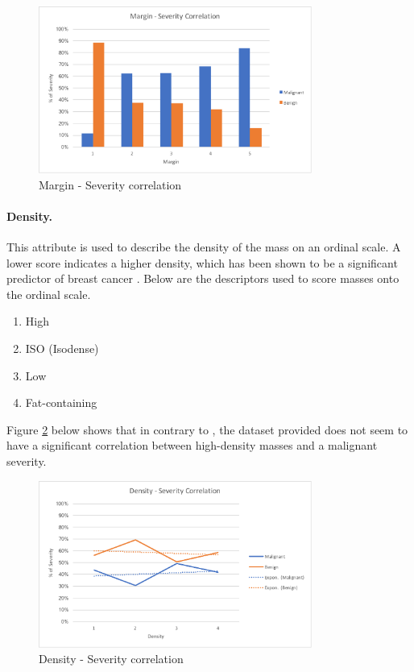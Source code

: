 \documentclass[12pt]{article}
\begin{document}
      \begin{figure}[H]
        \centering
        \includegraphics[width=0.8\textwidth]{margin-severity-correlation}
        \caption{Margin - Severity correlation}
        \label{fig:margin-severity-correlation}
      \end{figure}

    \paragraph{Density.}
      This attribute is used to describe the density of the mass on an ordinal scale. A lower score indicates a higher density, which has been shown to be a significant predictor of breast cancer \citep{woods2011mammographic}. Below are the descriptors used to score masses onto the ordinal scale.

      \singlespacing
      \begin{enumerate}[label=\arabic*)]
        \item High
        \item ISO (Isodense)
        \item Low
        \item Fat-containing
      \end{enumerate}
      \doublespacing

      Figure \ref{fig:density-severity-correlation} below shows that in contrary to \cite{woods2011mammographic}, the dataset provided does not seem to have a significant correlation between high-density masses and a malignant severity.

      \begin{figure}[H]
        \centering
        \includegraphics[width=0.8\textwidth]{density-severity-correlation}
        \caption{Density - Severity correlation}
        \label{fig:density-severity-correlation}
      \end{figure}
\end{document}
